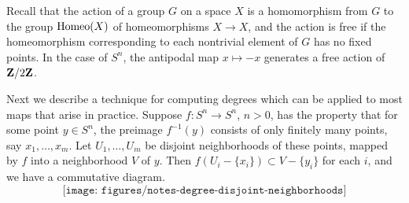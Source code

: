 Recall that the action of a group $G$ on a space $X$ is a homomorphism from
$G$ to the group $\operatorname{Homeo}(X)$ of homeomorphisms $X\to X$, and the action is
free if the homeomorphism corresponding to each nontrivial element of $G$
has no fixed points. In the case of $S^n$, the antipodal map $x\mapsto -x$
generates a free action of $\mathbf{Z}/2\mathbf{Z}$.

Next we describe a technique for computing degrees which can be applied to
most maps that arise in practice. Suppose $f\colon S^n\to S^n$, $n>0$, has
the property that for some point $y\in S^n$, the preimage $f^{-1}(y)$
consists of only finitely many points, say $x_1,\dotsc,x_m$. Let
$U_1,\dotsc,U_m$ be disjoint neighborhoods of these points, mapped by $f$
into a neighborhood $V$ of $y$. Then $f(U_i\minus\{x_i\})\subset
V\minus\{y_i\}$ for each $i$, and we have a commutative diagram.
\[
\texttt{[image: figures/notes-degree-disjoint-neighborhoods]}
\]

